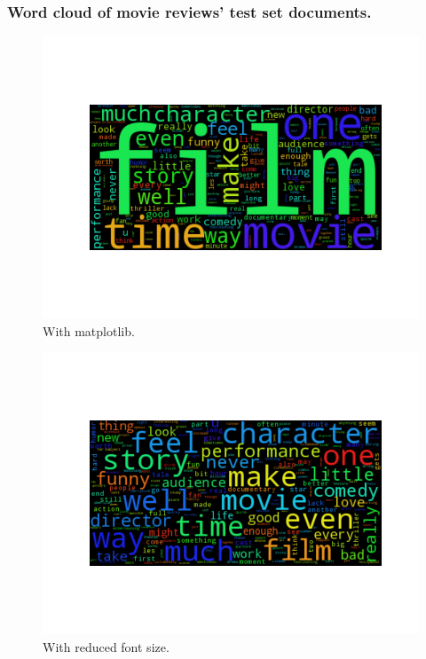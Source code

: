 \subsubsection{Word cloud of movie reviews' test set documents.}
\begin{figure}[H]
  \centering
  \includegraphics[width=1\textwidth]{graphics/sentiment_matplotlib.png}
  \caption{With matplotlib.}
\end{figure}
\begin{figure}[H]
  \centering
  \includegraphics[width=1\textwidth]{graphics/sentiment_reduced.png}
  \caption{With reduced font size.}
\end{figure}